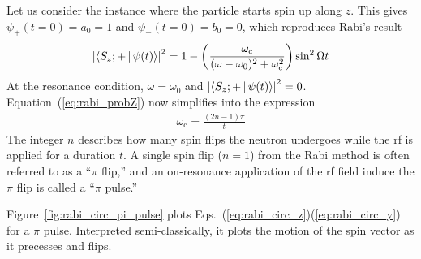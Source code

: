 %
Let us consider the instance where the particle starts spin up along $z$. This gives $\psi_+(t=0)=a_0=1$ and $\psi_-(t=0)=b_0=0$, which reproduces Rabi's result \cite{rabi_1938}
%
\begin{gather}
    \left| \Braket{S_z;+ | \psi(t)} \right|^2 = 1-\left( \frac{\omega_\text{c}}{(\omega -\omega_0)^2+\omega_\text{c}^2} \right) \sin^2\Omega t \label{eq:rabi_probZ}
\end{gather}
%
At the resonance condition, $\omega=\omega_0$ and $\left| \Braket{S_z;+ | \psi(t)} \right|^2=0$. Equation~(\ref{eq:rabi_probZ}) now simplifies into the expression
%
\begin{gather}
    \omega_\text{c}=\frac{(2n-1)\pi}{t} \label{eq:rabi_pi_pulse_time}
\end{gather}
%
The integer $n$ describes how many spin flips the neutron undergoes while the \acrshort*{rf} is applied for a duration $t$. A single spin flip ($n=1$) from the Rabi method is often referred to as a ``$\pi$ flip,'' and an on-resonance application of the \acrshort*{rf} field induce the $\pi$ flip is called a ``$\pi$ pulse.''

Figure~\ref{fig:rabi_circ_pi_pulse} plots Eqs.~(\ref{eq:rabi_circ_z})\textendash (\ref{eq:rabi_circ_y}) for a $\pi$ pulse. Interpreted semi-classically, it plots the motion of the spin vector as it precesses and flips.

